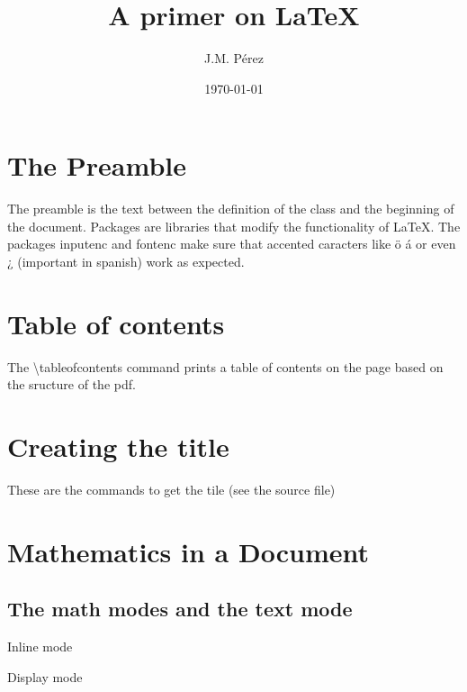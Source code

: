 \documentclass[a4paper]{article}
\begin{document}
\title{A primer on \LaTeX{}}
\author{J.M. Pérez}
\date{\today}


\maketitle

\tableofcontents

\section{The Preamble}

The preamble is the text between the definition of the class and the beginning of the document. Packages are libraries that modify the functionality of \cite{Knuth1990}\LaTeX{}. The packages inputenc and fontenc make sure that accented caracters like ö á or even ¿ (important in spanish) work as expected.

\section{Table of contents}

The \textbackslash{}tableofcontents command prints a table of contents on the page based on the sructure of the pdf.


\section{Creating the title}

These are the commands to get the tile (see the source file)



\section{Mathematics in a Document}

\subsection{The math modes and the text mode}

Inline mode

Display mode
\end{document}
